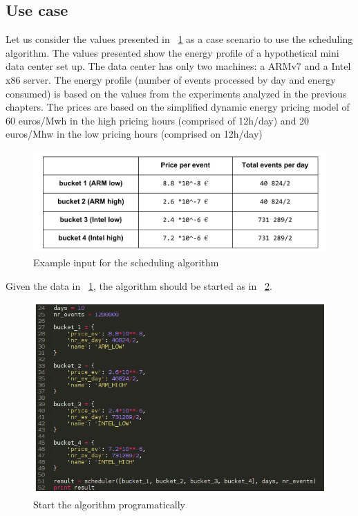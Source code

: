 \subsection*{Use case}

Let us consider the values presented in ~\ref{fig:input_table} as a case scenario to use the scheduling algorithm. The values presented show the energy profile of a hypothetical mini data center set up. The data center has only two machines: a ARMv7 and a Intel x86 server. The energy profile (number of events processed by day and energy consumed) is based on the values from the experiments analyzed in the previous chapters. The prices are based on the simplified dynamic energy pricing model of 60 euros/Mwh in the high pricing hours (comprised of 12h/day) and 20 euros/Mhw in the low pricing hours (comprised on 12h/day)

\begin{figure}[h]
  \centering
    \includegraphics[width=150mm]{"img/input_table"}
    \caption{Example input for the scheduling algorithm}
    \label{fig:input_table}
\end{figure}

Given the data in ~\ref{fig:input_table}, the algorithm should be started as in ~\ref{fig:scheduler_code_init}.

\begin{figure}[h]
  \centering
    \includegraphics[width=150mm]{"img/scheduler_code_init"}
    \caption{Start the algorithm programatically}
    \label{fig:scheduler_code_init}
\end{figure}

